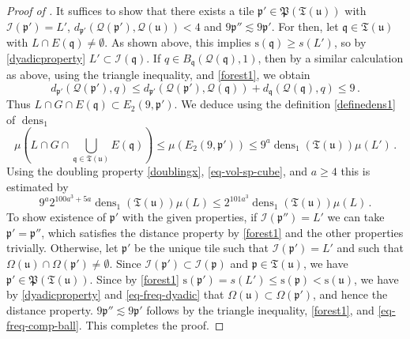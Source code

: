 \documentclass[10pt,a4paper]{article}
\theoremstyle{plain}
\theoremstyle{definition}
\numberwithin{equation}{subsection}
\DeclareMathOperator{\dens}{\operatorname{dens}}
\newcommand{\fp}{{\mathfrak p}}
\newcommand{\fP}{{\mathfrak P}}
\newcommand{\fu}{{\mathfrak u}}
\newcommand{\fq}{{\mathfrak q}}
\newcommand{\fT}{{\mathfrak T}}
\newcommand{\ps}{{\mathrm{s}}}
\newcommand{\scI}{{\mathcal{I}}} %
\newcommand{\fcc}{{\mathcal{Q}}}
\begin{document}
\begin{proof}[Proof of ]
    It suffices to show that there exists a tile $\fp' \in \fP(\fT(\fu))$ with $\scI(\fp') = L'$, $d_{\fp'}(\fcc(\fp'), \fcc(\fu)) < 4$ and $9\fp'' \lesssim 9\fp'$.
    For then, let $\fq \in \fT(\fu)$ with $L \cap E(\fq) \ne \emptyset$. As shown above, this implies $\ps(\fq) \ge s(L')$, so by \eqref{dyadicproperty} $L' \subset \scI(\fq)$.
    If $q \in B_{\fq}(\fcc(\fq), 1)$, then by a similar calculation as above, using the triangle inequality,  and \eqref{forest1}, we obtain
    $$
        d_{\fp'}(\fcc(\fp'), q) \le d_{\fp'}(\fcc(\fp'), \fcc(\fq)) + d_{\fq}(\fcc(\fq), q) \le 9\,.
    $$
    Thus $L \cap G \cap E(\fq) \subset E_2(9, \fp')$. We deduce using the definition \eqref{definedens1} of $\dens_1$
    $$
        \mu(L \cap G \cap \bigcup_{\fq \in \fT(\fu)} E(\fq)) \le \mu(E_2(9, \fp')) \le 9^a \dens_1(\fT(\fu)) \mu(L')\,.
    $$
    Using the doubling property \eqref{doublingx}, \eqref{eq-vol-sp-cube}, and $a \ge 4$ this is estimated by
    $$
        9^a 2^{100a^3 + 5a}\dens_1(\fT(\fu)) \mu(L) \le 2^{101 a^3} \dens_1(\fT(\fu))\mu(L)\,.
    $$
    To show existence of $\fp'$ with the given properties, if $\scI(\fp'') = L'$ we can take $\fp' = \fp''$, which satisfies the distance property by \eqref{forest1} and the other properties trivially.
    Otherwise, let $\fp'$ be the unique tile such that $\scI(\fp') = L'$ and such that $\Omega(\fu) \cap \Omega(\fp') \ne \emptyset$.
    Since $\scI(\fp') \subset \scI(\fp)$ and $\fp \in \fT(\fu)$, we have $\fp' \in \fP(\fT(\fu))$.
    Since by \eqref{forest1} $\ps(\fp') = s(L') \le \ps(\fp) < \ps(\fu)$, we have by \eqref{dyadicproperty} and \eqref{eq-freq-dyadic} that $\Omega(\fu) \subset \Omega(\fp')$, and hence the distance property.
    $9\fp'' \lesssim 9\fp'$ follows by the triangle inequality, \eqref{forest1},  and \eqref{eq-freq-comp-ball}.
    This completes the proof.
\end{proof}
\end{document}
